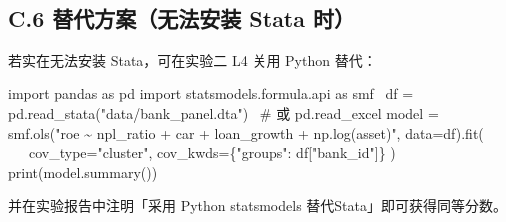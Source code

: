 \documentclass[
  american,
  chinese,
]{ctexart}
\begin{document}
~

\subsection{\texorpdfstring{\foreignlanguage{american}{C.6 }{\foreignlanguage{american}{替代方案（无法安装}}\foreignlanguage{american}{ Stata }\foreignlanguage{american}{时）}}{C.6 替代方案（无法安装 Stata 时）}}\label{c.6-ux66ffux4ee3ux65b9ux6848ux65e0ux6cd5ux5b89ux88c5-stata-ux65f6}

{若实在无法安装}\foreignlanguage{american}{ Stata}{，可在实验二}\foreignlanguage{american}{ L4 }{关用}\foreignlanguage{american}{ Python }{替代：}\foreignlanguage{american}{}

\foreignlanguage{american}{import pandas
as pd import {statsmodels.formula.api} as {{smf}}{{~ }{df}} = {{pd.read}\_stata}("data/{bank\_panel.dta}{"){~ }\#} }\foreignlanguage{american}{或}\foreignlanguage{american}{ {{pd.read}\_excel}
model = {{smf.ols}}{(}"roe \textasciitilde{} {npl\_ratio} + car + {loan\_growth} + np.log(asset)", data={df}{).fit({~ }}{~~~}{cov\_type}="cluster",
{cov\_kwds}{=\{}"groups":
{df}{[}"{bank\_id}"{]}{\} )} print({{model.summary}}())
}

{\foreignlanguage{american}{并在实验报告中注明「采用}}\foreignlanguage{american}{ Python {statsmodels} }{\foreignlanguage{american}{替代}}\foreignlanguage{american}{ {Stata{」即可获得同等分数}}}\foreignlanguage{american}{。}
\end{document}
